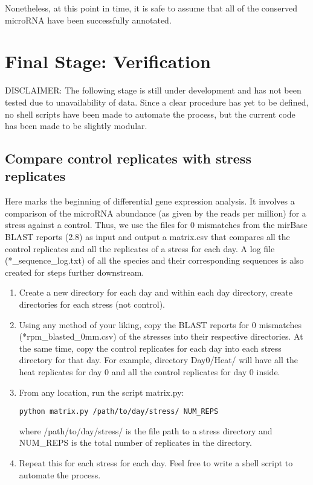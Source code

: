 \documentclass[12pt,titlepage]{article}
\begin{document}
\noindent Nonetheless, at this point in time, it is safe to assume that all of the conserved microRNA have been successfully annotated.

\section{Final Stage: Verification}
DISCLAIMER: The following stage is still under development and has not been tested due to unavailability of data. Since a clear procedure has yet to be defined, no shell scripts have been made to automate the process, but the current code has been made to be slightly modular.
\subsection{Compare control replicates with stress replicates}

Here marks the beginning of differential gene expression analysis. It involves a comparison of the microRNA abundance (as given by the reads per million) for a stress against a control. Thus, we use the files for 0 mismatches from the mirBase BLAST reports (2.8) as input and output a matrix.csv that compares all the control replicates and all the replicates of a stress for each day. A log file (*\_sequence\_log.txt) of all the species and their corresponding sequences is also created for steps further downstream.
\begin{enumerate}
\item Create a new directory for each day and within each day directory, create directories for each stress (not control).
\item Using any method of your liking, copy the BLAST reports for 0 mismatches (*rpm\_blasted\_0mm.csv) of the stresses into their respective directories. At the same time, copy the control replicates for each day into each stress directory for that day. For example, directory Day0/Heat/ will have all the heat replicates for day 0 and all the control replicates for day 0 inside.
\item From any location, run the script matrix.py:
\begin{tcolorbox}
\begin{lstlisting}
python matrix.py /path/to/day/stress/ NUM_REPS 
\end{lstlisting}
\end{tcolorbox} 
where /path/to/day/stress/ is the file path to a stress directory and NUM\_REPS is the total number of replicates in the directory.
\item Repeat this for each stress for each day. Feel free to write a shell script to automate the process.   
\end{enumerate}
\end{document}

